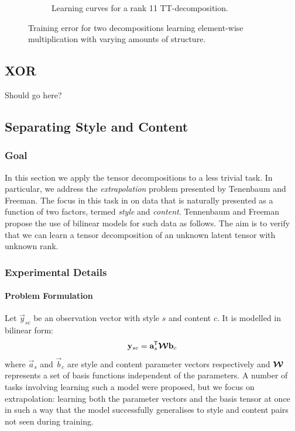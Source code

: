 \begin{figure}
\begin{subfigure}[t]{0.45\textwidth}
		\caption{Learning curves for a rank 11 TT-decomposition.}
	\end{subfigure}
	\caption{Training error for two decompositions learning element-wise multiplication with
	 varying amounts of structure.}
	\label{fig:correlate-multiply}
\end{figure}

\subsection{XOR}
Should go here?

\subsection{Separating Style and Content}
\subsubsection{Goal}
In this section we apply the tensor decompositions to a less trivial task. In particular, we
address the \textit{extrapolation} problem presented by Tenenbaum and 
Freeman. \autocite{Tenenbaum2000} The focus in this task in on data that is naturally presented as a
function of two factors, termed \textit{style} and \textit{content}. Tennenbaum and Freeman
propose the use of bilinear models for such data as follows. The aim is to verify that we
can learn a tensor decomposition of an unknown latent tensor with unknown rank.

\subsubsection{Experimental Details}
\paragraph{Problem Formulation}
Let \(\vec{y}_{sc}\) be an observation vector with style \(s\) and content \(c\). It is modelled
in bilinear form:
\begin{equation}
	\mathbf{y}_{sc} = \mathbf{a}_s^{\mkern-1.5mu\mathsf{T}}\bm{\mathcal{W}}\mathbf{b}_c
\end{equation} where \(\vec{a}_s\) and \(\vec{b}_c\) are style and content parameter vectors
respectively and \(\bm{\mathcal{W}}\) represents a set of basis functions independent of the parameters.
A number of tasks involving learning such a model were proposed, but we focus on extrapolation:
 learning both the parameter vectors and the basis tensor at once in such a way that
the model successfully generalises to style and content pairs not seen during training.

